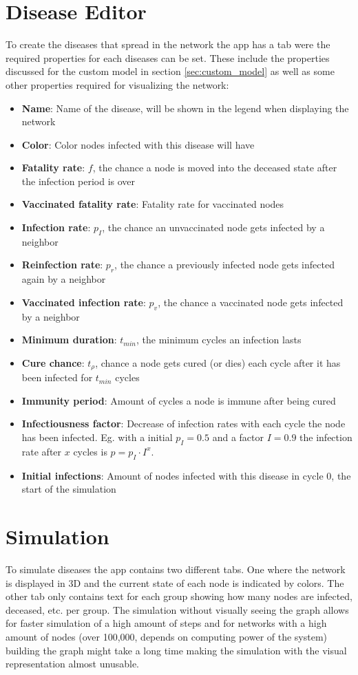 \section{Disease Editor}
To create the diseases that spread in the network the app has a tab were the required properties
for each diseases can be set. These include the properties discussed for the custom model in
section \ref{sec:custom_model} as well as some other properties required for visualizing the network:
\begin{itemize}
    \item \textbf{Name}: Name of the disease, will be shown in the legend when displaying the network
    \item \textbf{Color}: Color nodes infected with this disease will have
    \item \textbf{Fatality rate}: $f$, the chance a node is moved into the deceased state after the infection period is over
    \item \textbf{Vaccinated fatality rate}: Fatality rate for vaccinated nodes
    \item \textbf{Infection rate}: $p_I$, the chance an unvaccinated node gets infected by a neighbor
    \item \textbf{Reinfection rate}: $p_r$, the chance a previously infected node gets infected again by a neighbor
    \item \textbf{Vaccinated infection rate}: $p_v$, the chance a vaccinated node gets infected by a neighbor
    \item \textbf{Minimum duration}: $t_{min}$, the minimum cycles an infection lasts
    \item \textbf{Cure chance}: $t_\rho$, chance a node gets cured (or dies) each cycle after it has been
    infected for $t_{min}$ cycles
    \item \textbf{Immunity period}: Amount of cycles a node is immune after being cured
    \item \textbf{Infectiousness factor}: Decrease of infection rates with each cycle the node has been infected.
    Eg. with a initial $p_I = 0.5$ and a factor $I = 0.9$ the infection rate after $x$ cycles is $p = p_I \cdot I^x$.
    \item \textbf{Initial infections}: Amount of nodes infected with this disease in cycle 0, the start of the simulation
\end{itemize}

\section{Simulation}
To simulate diseases the app contains two different tabs. One where the network is displayed
in 3D and the current state of each node is indicated by colors. The other tab only contains
text for each group showing how many nodes are infected, deceased, etc. per group. The simulation
without visually seeing the graph allows for faster simulation of a high amount of steps and for
networks with a high amount of nodes (over 100,000, depends on computing power of the system)
building the graph might take a long time making the simulation with the visual representation
almost unusable.

